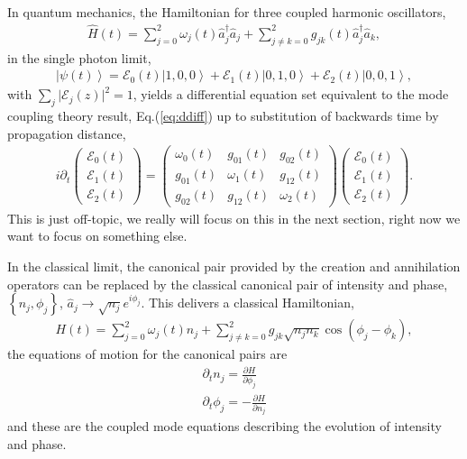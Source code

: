\documentclass[9pt,twocolumn,twoside]{osajnl}
\begin{document}
In quantum mechanics, the Hamiltonian for three coupled harmonic oscillators, 
\begin{eqnarray}
	\hat{H}(t) = \sum_{j=0}^{2} \omega_j(t) \hat{a}^{\dagger}_j \hat{a}_{j} + \sum_{j\neq k=0}^{2} g_{jk}(t) \hat{a}^{\dagger}_j \hat{a}_k,
\end{eqnarray}
in the single photon limit,
\begin{eqnarray}
	\left\vert \psi(t) \right\rangle = \mathcal{E}_{0}(t) \left\vert 1, 0, 0 \right\rangle  +
	\mathcal{E}_{1}(t) \left\vert 0,1,0 \right\rangle + \mathcal{E}_{2}(t) \left\vert 0,0,1 \right\rangle,
\end{eqnarray}
with $ \sum_{j} \vert \mathcal{E}_{j}(z) \vert^2 = 1$, yields a differential equation set equivalent to the mode coupling theory result, Eq.(\ref{eq:ddiff}) up to substitution of backwards time by propagation distance,
\begin{eqnarray}
	i \partial_t	
	\left( \begin{array}{c} 
		\mathcal{E}_{0}(t) \\
		\mathcal{E}_{1}(t) \\
		\mathcal{E}_{2}(t)
	\end{array} \right) =
	\left( \begin{array}{ccc} 
		\omega_{0}(t)  & g_{01}(t) & g_{02}(t) \\
		g_{01}(t) & \omega_{1}(t) & g_{12}(t) \\
		g_{02}(t) & g_{12}(t) & \omega_{2}(t)
	\end{array} \right)
	\left( \begin{array}{c} 
		\mathcal{E}_{0}(t) \\
		\mathcal{E}_{1}(t) \\
		\mathcal{E}_{2}(t)
	\end{array} \right) .
\end{eqnarray}
This is just off-topic, we really will focus on this in the next section, right now we want to focus on something else.

In the classical limit, the canonical pair provided by the creation and annihilation operators can be replaced by the classical canonical pair of intensity and phase, $\left\{ n_{j}, \phi_{j} \right\}$, $ \hat{a}_{j} \rightarrow \sqrt{n_{j}}e^{i \phi_{j}}$. 
This delivers a classical Hamiltonian, 
\begin{eqnarray}
H(t) = \sum_{j=0}^{2} \omega_{j}(t) n_{j}  
	+ \sum_{j \neq k = 0}^{2} g_{jk} \sqrt{n_{j} n_{k}} \cos \left( \phi_{j} - \phi_{k} \right),
\end{eqnarray}
the equations of motion for the canonical pairs are 
\begin{eqnarray}
\partial_t n_j = \frac{\partial H}{\partial \phi_j}\\
\partial_t \phi_j = - \frac{\partial H}{\partial n_j}  
\end{eqnarray}
and these are the coupled mode equations describing the evolution of intensity and phase.
\end{document}

